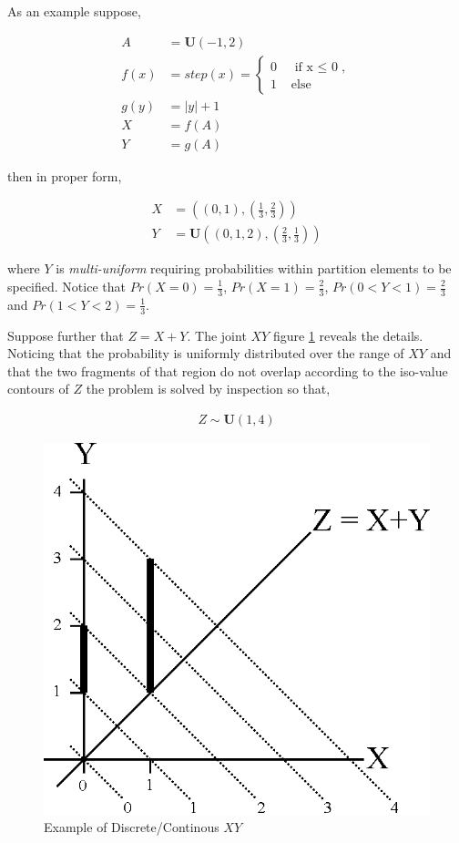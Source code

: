 As an example suppose,

\begin{align*}
A &= \mathbf{U}(-1,2)\\
f(x) &= step(x) = \begin{cases}
0 & \text{ if x $\le$ 0},\\
1 & \text{ else}
\end{cases}\\
g(y) &= |y| + 1\\
X &= f(A)\\
Y &= g(A)
\end{align*}

then in proper form,

\begin{align*}
X &= ((0,1),(\frac{1}{3},\frac{2}{3}))\\
Y &= \mathbf{U}((0,1,2),(\frac{2}{3}, \frac{1}{3}))
\end{align*}

where $Y$ is \emph{multi-uniform} requiring probabilities within partition elements to be specified. Notice that $Pr(X = 0) = \frac{1}{3}$, $Pr(X = 1) = \frac{2}{3}$, $Pr(0 < Y < 1) = \frac{2}{3}$ and $Pr(1 < Y < 2) = \frac{1}{3}$. 

Suppose further that $Z = X+Y$. The joint $XY$ figure \ref{fig:XY_01_example} reveals the details. Noticing that the probability is uniformly distributed over the range of $XY$ and that the two fragments of that region do not overlap according to the iso-value contours of $Z$ the problem is solved by inspection so that,

\begin{align*}
Z \sim \mathbf{U}(1,4)
\end{align*}

\begin{figure}
  \centering
  \includegraphics{Images/XY_01_example.eps}
  \caption[Example of Correlated Discrete $X$ and Continous $Y$ in $XY$-space]
          {Example of Discrete/Continous $XY$}
  \label{fig:XY_01_example}
\end{figure}

